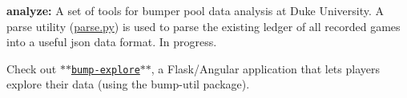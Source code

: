 {\bfseries analyze\+:} A set of tools for bumper pool data analysis at Duke University. A parse utility (\hyperlink{parse_8py}{parse.\+py}) is used to parse the existing ledger of all recorded games into a useful json data format. In progress.

Check out \href{https://github.com/suyashkumar/bump-explore}{\tt $\ast$$\ast$bump-\/explore$\ast$$\ast$}, a Flask/\+Angular application that lets players explore their data (using the bump-\/util package). 